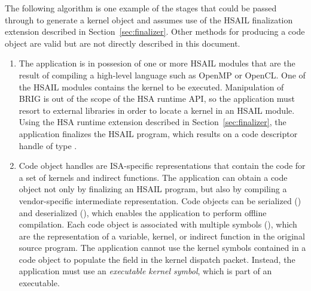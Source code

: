 \documentclass[final,oneside]{book}
\begin{document}
The following algorithm is one example of the stages that could be passed
through to generate a kernel object and assumes use of the HSAIL finalization
extension described in Section~\ref{sec:finalizer}. Other methods for producing
a code object are valid but are not directly described in this document.
\begin{enumerate}
\item The application is in possesion of one or more HSAIL modules that are the
  result of compiling a high-level language such as OpenMP or OpenCL. One of the
  HSAIL modules contains the kernel to be executed. Manipulation of BRIG is out
  of the scope of the HSA runtime API, so the application must resort to
  external libraries in order to locate a kernel in an HSAIL module. Using the
  HSA runtime extension described in Section~\ref{sec:finalizer}, the
  application finalizes the HSAIL program, which results on a code descriptor
  handle of type .
\item Code object handles are ISA-specific representations that contain the code
  for a set of kernels and indirect functions. The application can obtain a code
  object not only by finalizing an HSAIL program, but also by compiling a
  vendor-specific intermediate representation. Code objects can be serialized
  () and deserialized
  (), which enables the application to
  perform offline compilation. Each code object is associated with multiple
  symbols (), which are the representation of a
  variable, kernel, or indirect function in the original source program. The
  application cannot use the kernel symbols contained in a code object to
  populate the  field in the
  kernel dispatch packet. Instead, the application must use an
  \textit{executable kernel symbol}, which is part of an executable.


\end{enumerate}
\end{document}
